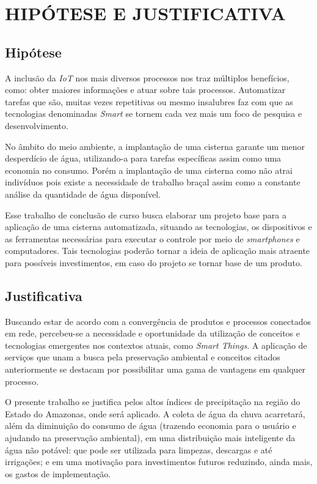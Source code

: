
\chapter{HIPÓTESE E JUSTIFICATIVA}
\label{chap:hipoteseejustificativa}

\section{Hipótese}
\label{sec:hipotese}

A inclusão da \textit{IoT} nos mais diversos processos nos traz múltiplos benefícios, como: obter maiores informações e atuar sobre tais processos. Automatizar tarefas que são, muitas vezes repetitivas ou mesmo insalubres faz com que as tecnologias denominadas \textit{Smart} se tornem cada vez mais um foco de pesquisa e desenvolvimento. 

No âmbito do meio ambiente, a implantação de uma cisterna garante um menor desperdício de água, utilizando-a para tarefas específicas assim como uma economia no consumo. Porém a implantação de uma cisterna como não atrai indivíduos pois existe a necessidade de trabalho braçal assim como a constante análise da quantidade de água disponível.

Esse trabalho de conclusão de curso busca elaborar um projeto base para a aplicação de uma cisterna automatizada, situando as tecnologias, os dispositivos e as ferramentas necessárias para executar o controle por meio de \textit{smartphones} e computadores. Tais tecnologias poderão tornar a ideia de aplicação mais atraente para possíveis investimentos, em caso do projeto se tornar base de um produto.



\section{Justificativa}
\label{sec:justificativa}

Buscando estar de acordo com a convergência de produtos e processos conectados em rede, percebeu-se a necessidade e oportunidade da utilização de conceitos e tecnologias emergentes nos contextos atuais, como \textit{Smart Things}. A aplicação de serviços que unam a busca pela preservação ambiental e conceitos citados anteriormente se destacam por possibilitar uma gama de vantagens em qualquer processo.

O presente trabalho se justifica pelos altos índices de precipitação na região do Estado do Amazonas, onde será aplicado. A coleta de água da chuva acarretará, além da diminuição do consumo de água (trazendo economia para o usuário e ajudando na preservação ambiental), em uma distribuição mais inteligente da água não potável: que pode ser utilizada para limpezas, descargas e até irrigações; e em uma motivação para investimentos futuros reduzindo, ainda mais, os gastos de implementação.

